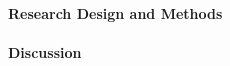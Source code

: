 \documentclass[12pt]{article}
\begin{document}
\paragraph{Research Design and Methods}




\paragraph{Discussion}





\end{document}
